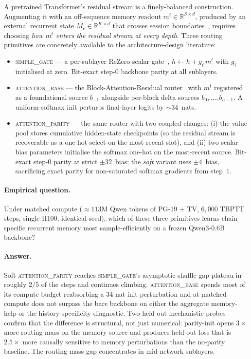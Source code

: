 \documentclass{article}
\newcommand{\Mc}{M_{\text{c}}}
\begin{document}
A pretrained Transformer's residual stream is a finely-balanced
construction.  Augmenting it with an off-sequence memory readout
$m^t \in \mathbb{R}^{S\times d}$, produced by an external recurrent
state $\Mc \in \mathbb{R}^{K\times d}$ that crosses session
boundaries~\cite{daiTransformerXL2019, rae2019compressive,
bulatov2022rmt, hutchins2022blockrecurrent, wu2022memorising,
xie2024lrmt}, requires choosing \emph{how $m^t$ enters the residual
stream at every depth}.  Three routing primitives are concretely
available to the architecture-design literature:
\begin{itemize}\setlength{\itemsep}{1pt}
\item \textsc{simple\_gate} --- a per-sublayer ReZero scalar
  gate~\cite{bachlechner2021rezero}, $h \leftarrow h + g_\ell\,m^t$
  with $g_\ell$ initialised at zero.  Bit-exact step-0 backbone
  parity at all sublayers.
\item \textsc{attention\_base} --- the Block-Attention-Residual
  router~\cite{du2025blockattnres} with $m^t$ registered as a
  foundational source $b_{-1}$ alongside per-block delta sources
  $b_0, \dots, b_{n-1}$.  A uniform-softmax init perturbs
  final-layer logits by ${\sim}34$~nats.
\item \textsc{attention\_parity} --- the same router with two coupled
  changes: (i) the value pool stores cumulative hidden-state
  checkpoints (so the residual stream is recoverable as a one-hot
  select on the most-recent slot), and (ii) two scalar bias
  parameters initialise the softmax one-hot on the most-recent
  source.  Bit-exact step-0 parity at strict $\pm 32$~bias; the
  \emph{soft} variant uses $\pm 4$~bias, sacrificing exact parity for
  non-saturated softmax gradients from step~$1$.
\end{itemize}

\paragraph{Empirical question.}
Under matched compute (${\approx}113$M Qwen tokens of PG-19 + TV,
$6{,}000$ TBPTT steps, single H100, identical seed), which of these
three primitives learns chain-specific recurrent memory most
sample-efficiently on a frozen Qwen3-0.6B backbone?

\paragraph{Answer.}
Soft \textsc{attention\_parity} reaches \textsc{simple\_gate}'s
asymptotic shuffle-gap plateau in roughly $2/5$ of the steps and
continues climbing.  \textsc{attention\_base} spends most of its
compute budget reabsorbing a $34$-nat init perturbation and at
matched compute does not surpass the bare backbone on either the
aggregate memory-help or the history-specificity diagnostic.  Two
held-out mechanistic probes confirm that the difference is
structural, not just numerical: parity-init opens $3\times$ more
routing mass on the memory source and produces held-out loss that is
$2.5\times$ more causally sensitive to memory perturbations than the
no-parity baseline.  The routing-mass gap concentrates in
mid-network sublayers.
\end{document}

